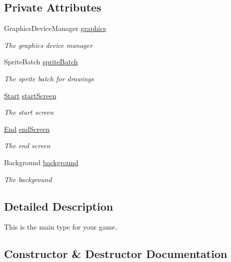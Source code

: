\subsection*{Private Attributes}
\begin{DoxyCompactItemize}
\item 
Graphics\+Device\+Manager \hyperlink{classXaria_1_1Game1_a1bbdbcd137d3484aa8c662c8574ac1a3}{graphics}
\begin{DoxyCompactList}\small\item\em The graphics device manager \end{DoxyCompactList}\item 
Sprite\+Batch \hyperlink{classXaria_1_1Game1_a5c9ecabcaf53ac9aa1a8fd1d18a9e585}{sprite\+Batch}
\begin{DoxyCompactList}\small\item\em The sprite batch for drawings \end{DoxyCompactList}\item 
\hyperlink{namespaceXaria_a2c2420c982c39ab01bdb72f1d7d4aac7aa6122a65eaa676f700ae68d393054a37}{Start} \hyperlink{classXaria_1_1Game1_a6707e2f65e76cd15207852d0f502f07c}{start\+Screen}
\begin{DoxyCompactList}\small\item\em The start screen \end{DoxyCompactList}\item 
\hyperlink{namespaceXaria_a2c2420c982c39ab01bdb72f1d7d4aac7a87557f11575c0ad78e4e28abedc13b6e}{End} \hyperlink{classXaria_1_1Game1_a24d32974a54581bfc6931f9dd8b3b107}{end\+Screen}
\begin{DoxyCompactList}\small\item\em The end screen \end{DoxyCompactList}\item 
Background \hyperlink{classXaria_1_1Game1_a78d1a6b1749b5d112ca90524a74728ed}{background}
\begin{DoxyCompactList}\small\item\em The background \end{DoxyCompactList}\end{DoxyCompactItemize}


\subsection{Detailed Description}
This is the main type for your game. 



\subsection{Constructor \& Destructor Documentation}
\mbox{\label{classXaria_1_1Game1_aa7b8268d52c2f0435734c83f3d76f266}} 
